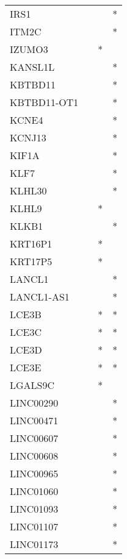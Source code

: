 \begin{longtable}{lccc}
IRS1           &           &     &       * \\
ITM2C          &           &     &       * \\
IZUMO3         &           &   * &         \\
KANSL1L        &           &     &       * \\
KBTBD11        &           &     &       * \\
KBTBD11-OT1    &           &     &       * \\
KCNE4          &           &     &       * \\
KCNJ13         &           &     &       * \\
KIF1A          &           &     &       * \\
KLF7           &           &     &       * \\
KLHL30         &           &     &       * \\
KLHL9          &           &   * &         \\
KLKB1          &           &     &       * \\
KRT16P1        &           &   * &         \\
KRT17P5        &           &   * &         \\
LANCL1         &           &     &       * \\
LANCL1-AS1     &           &     &       * \\
LCE3B          &           &   * &       * \\
LCE3C          &           &   * &       * \\
LCE3D          &           &   * &       * \\
LCE3E          &           &   * &       * \\
LGALS9C        &           &   * &         \\
LINC00290      &           &     &       * \\
LINC00471      &           &     &       * \\
LINC00607      &           &     &       * \\
LINC00608      &           &     &       * \\
LINC00965      &           &     &       * \\
LINC01060      &           &     &       * \\
LINC01093      &           &     &       * \\
LINC01107      &           &     &       * \\
LINC01173      &           &     &       * \\

\end{longtable}
